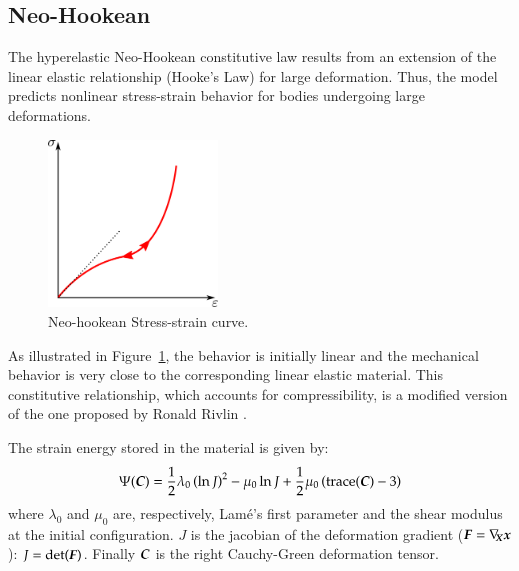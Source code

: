 
\subsection{Neo-Hookean}

The hyperelastic Neo-Hookean constitutive law results from an
extension of the linear elastic relationship (Hooke's Law) for large
deformation. Thus, the model predicts nonlinear stress-strain behavior
for bodies undergoing large deformations.

\begin{figure}[!htb]
  \begin{center}
    \includegraphics[width=0.4\textwidth,keepaspectratio=true]{figures/stress_strain_neo.pdf}
    \caption{Neo-hookean Stress-strain curve.}
    \label{fig:smm:cl:neo_hookean}
  \end{center}
\end{figure}

As illustrated in Figure~\ref{fig:smm:cl:neo_hookean}, the behavior is initially
linear and the mechanical behavior is very close to the corresponding linear
elastic material. This constitutive relationship, which accounts for compressibility,
 is a modified version of the one proposed by Ronald Rivlin \cite{Belytschko:2000}.

The strain energy stored in the material is given by:
\begin{equation}\label{eqn:smm:constitutive:neohookean_potential}
  \Psi(\boldsymbol{C}) = \frac{1}{2}\lambda_0\left(\ln J\right)^2-\mu_0\ln J+\frac{1}{2}
\mu_0\left(\text{trace}(\boldsymbol{C})-3\right)
\end{equation}
\noindent where $\lambda_0$ and $\mu_0$ are, respectively, Lamé's first parameter
and the shear modulus at the initial configuration. $J$ is the jacobian of the deformation
gradient ($\boldsymbol{F}=\nabla_{\!\!\boldsymbol{X}}\boldsymbol{x}$): $J=\text{det}(\boldsymbol{F})$. Finally $\boldsymbol{C}$ is the right Cauchy-Green
deformation tensor.

